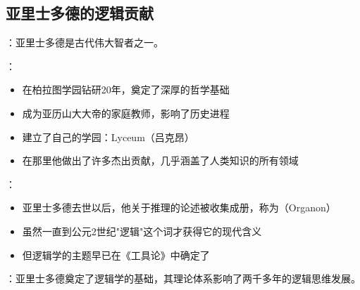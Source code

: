 \subsection{亚里士多德的逻辑贡献}

\begin{theorembox}[title=亚里士多德的学术生涯]
：亚里士多德是古代伟大智者之一。

：
\begin{itemize}
  \item 在柏拉图学园钻研20年，奠定了深厚的哲学基础
  \item 成为亚历山大大帝的家庭教师，影响了历史进程
  \item 建立了自己的学园：Lyceum（吕克昂）
  \item 在那里他做出了许多杰出贡献，几乎涵盖了人类知识的所有领域
\end{itemize}

：
\begin{itemize}
  \item 亚里士多德去世以后，他关于推理的论述被收集成册，称为（Organon）
  \item 虽然一直到公元2世纪"逻辑"这个词才获得它的现代含义
  \item 但逻辑学的主题早已在《工具论》中确定了
\end{itemize}

：亚里士多德奠定了逻辑学的基础，其理论体系影响了两千多年的逻辑思维发展。
\end{theorembox}

